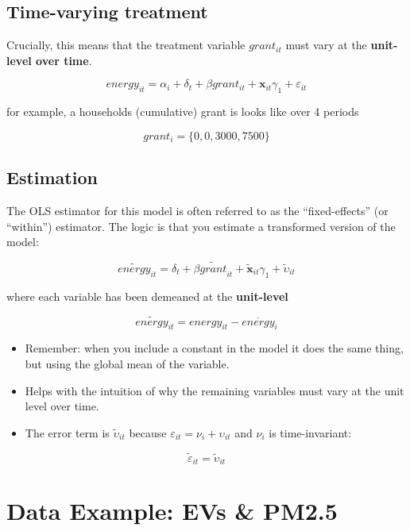 \documentclass[
  letterpaper,
  DIV=11,
  numbers=noendperiod]{scrartcl}
\begin{document}
\subsection{Time-varying treatment}\label{time-varying-treatment}

Crucially, this means that the treatment variable \(grant_{it}\) must
vary at the \textbf{unit-level over time}.

\[
  energy_{it} = \alpha_i + \delta_t + \beta grant_{it} + \mathbf{x}_{it}\gamma_1 + \varepsilon_{it}
\]

for example, a households (cumulative) grant is looks like over 4
periods

\[
  grant_{i} = \{0,0,3000,7500\}
\]

\subsection{Estimation}\label{estimation}

The OLS estimator for this model is often referred to as the
``fixed-effects'' (or ``within'') estimator. The logic is that you
estimate a transformed version of the model:

\[
  \widetilde{energy}_{it} = \delta_t + \beta \widetilde{grant}_{it} + \widetilde{\mathbf{x}}_{it}\gamma_1 + \tilde{\upsilon}_{it}
\]

where each variable has been demeaned at the \textbf{unit-level}

\[
  \widetilde{energy}_{it} = energy_{it} - \overline{energy}_{i}
\]

\begin{itemize}
\item
  Remember: when you include a constant in the model it does the same
  thing, but using the global mean of the variable.
\item
  Helps with the intuition of why the remaining variables must vary at
  the unit level over time.
\item
  The error term is \(\tilde{\upsilon}_{it}\) because
  \(\varepsilon_{it} = \nu_{i}+\upsilon_{it}\) and \(\nu_{i}\) is
  time-invariant:
\end{itemize}

\[
    \tilde{\varepsilon}_{it} = \tilde{\upsilon}_{it}
  \]

\section{Data Example: EVs \& PM2.5}\label{data-example-evs-pm2.5}
\end{document}
